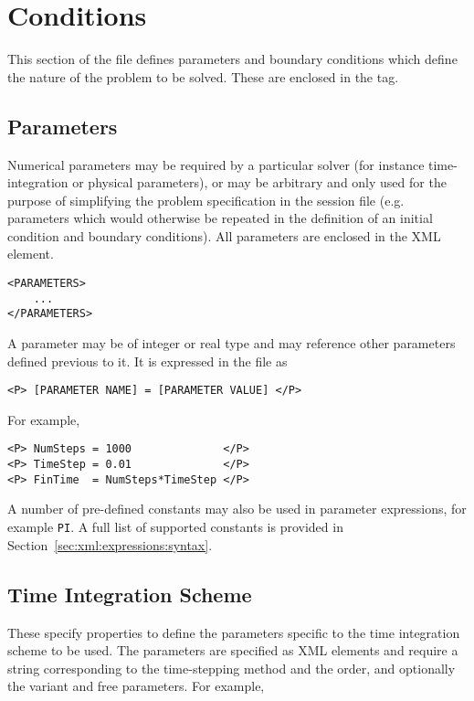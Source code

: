 \section{Conditions}
This section of the file defines parameters and boundary conditions which
define the nature of the problem to be solved. These are enclosed in the
 tag.

\subsection{Parameters}

Numerical parameters may be required by a particular solver (for instance time-integration or physical parameters), or may be arbitrary and only used for the purpose of simplifying the problem specification in the session file (e.g. parameters which would otherwise be repeated in the definition of an initial
condition and boundary conditions). All parameters are enclosed in the  XML element.

\begin{lstlisting}[style=XMLStyle] 
<PARAMETERS>
    ...
</PARAMETERS>
\end{lstlisting}

A parameter may be of integer or real type and may reference other parameters
defined previous to it. It is expressed in the file as

\begin{lstlisting}[style=XMLStyle]
<P> [PARAMETER NAME] = [PARAMETER VALUE] </P>
\end{lstlisting}

For example,

\begin{lstlisting}[style=XMLStyle]
<P> NumSteps = 1000              </P>
<P> TimeStep = 0.01              </P>
<P> FinTime  = NumSteps*TimeStep </P>
\end{lstlisting}

A number of pre-defined constants may also be used in parameter expressions, for example \texttt{PI}. A full list of supported constants is provided in Section~\ref{sec:xml:expressions:syntax}.

\subsection{Time Integration Scheme}

These specify properties to define the parameters specific to the time
integration scheme to be used. The parameters are specified as XML
elements and require a string corresponding to the time-stepping method
and the order, and optionally the variant and free parameters. For
example,

